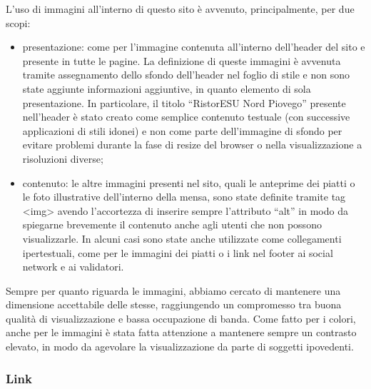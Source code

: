 \documentclass[10pt,a4paper,onecolumn]{article}
\begin{document}
L’uso di immagini all’interno di questo sito è avvenuto, principalmente, per due scopi:
\begin{itemize}
 \item presentazione: come per l’immagine contenuta all’interno dell’header del sito e presente in tutte le pagine. La definizione di queste immagini è avvenuta tramite assegnamento dello sfondo dell’header nel foglio di stile e non sono state aggiunte informazioni aggiuntive, in quanto elemento di sola presentazione. In particolare, il titolo ``RistorESU Nord Piovego'' presente nell’header è stato creato come semplice contenuto testuale (con successive applicazioni di stili idonei) e non come parte dell’immagine di sfondo per evitare problemi durante la fase di resize del browser o nella visualizzazione a risoluzioni diverse;
 \item contenuto: le altre immagini presenti nel sito, quali le anteprime dei piatti o le foto illustrative dell’interno della mensa, sono state definite tramite tag <img> avendo l’accortezza di inserire sempre l’attributo ``alt'' in modo da spiegarne brevemente il contenuto anche agli utenti che non possono visualizzarle.  In alcuni casi sono state anche utilizzate come collegamenti ipertestuali, come per le immagini dei piatti o i link nel footer ai social network e ai validatori.
\end{itemize}
Sempre per quanto riguarda le immagini, abbiamo cercato di mantenere una dimensione accettabile delle stesse, raggiungendo un compromesso tra buona qualità di visualizzazione e bassa occupazione di banda. Come fatto per i colori, anche per le immagini è stata fatta attenzione a mantenere sempre un contrasto elevato, in modo da agevolare la visualizzazione da parte di soggetti ipovedenti.

\subsubsection{Link}
\end{document}
